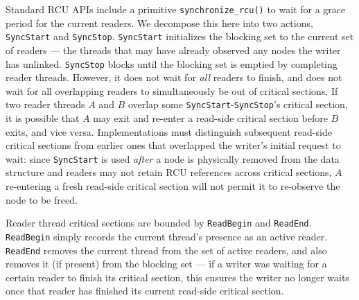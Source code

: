 Standard RCU APIs include a primitive \texttt{synchronize\_rcu()} to wait for a grace period for the current readers.  We decompose this here into two actions, \lstinline|SyncStart| and \lstinline|SyncStop|.
\lstinline|SyncStart| initializes the blocking set to the current set of readers --- the threads that may have already observed any nodes the writer has unlinked.
\lstinline|SyncStop| blocks until the blocking set is emptied by completing reader threads. However, it does not wait for \emph{all} readers to finish, and does not wait for all overlapping readers to simultaneously be out of critical sections. If two reader threads $A$ and $B$ overlap some \lstinline|SyncStart|-\lstinline|SyncStop|'s critical section, it is possible that $A$ may exit and re-enter a read-side critical section before $B$ exits, and vice versa.  Implementations must distinguish subsequent read-side critical sections from earlier ones that overlapped the writer's initial request to wait: since \lstinline|SyncStart| is used \emph{after} a node is physically removed from the data structure and readers may not retain RCU references across critical sections, $A$ re-entering a fresh read-side critical section will not permit it to re-observe the node to be freed.

Reader thread critical sections are
bounded by \lstinline|ReadBegin| and \lstinline|ReadEnd|.  \lstinline|ReadBegin| simply records the current thread's presence as an active reader.
\lstinline|ReadEnd| removes the current thread from the set of active readers, and also removes it (if present) from the blocking set --- if a writer was waiting for a certain reader to finish its critical section, this ensures the writer no longer waits once that reader has finished its current read-side critical section.

